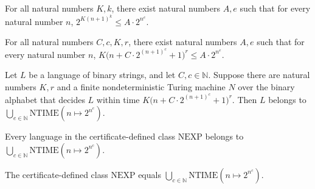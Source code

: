 \begin{lemma}
\label{Complexity.a2_exponent_bound}
\leanok
{}
For all natural numbers $K,k$, there exist natural numbers $A,e$ such that for every
natural number $n$, $2^{K(n+1)^k}\le A\cdot 2^{n^e}$.
\end{lemma}

\begin{lemma}
\label{Complexity.a2_envelope}
\leanok
{}
For all natural numbers $C,c,K,r$, there exist natural numbers $A,e$ such that for every
natural number $n$, $K\bigl(n+C\cdot 2^{(n+1)^c}+1\bigr)^r\le A\cdot 2^{n^e}$.
\end{lemma}

\begin{lemma}
\label{Complexity.a2_normalize}
\leanok
{}
Let $L$ be a language of binary strings, and let $C,c\in\mathbb{N}$. Suppose there are
natural numbers $K,r$ and a finite nondeterministic Turing machine $N$ over the binary
alphabet that decides $L$ within time $K\bigl(n+C\cdot 2^{(n+1)^c}+1\bigr)^r$. Then $L$
belongs to $\bigcup_{e\in\mathbb{N}}\mathrm{NTIME}(n\mapsto 2^{n^e})$.
\end{lemma}

\begin{theorem}
\label{Complexity.NEXP_subset_iUnion_NTIME}
\leanok
{}
Every language in the certificate-defined class $\mathrm{NEXP}$ belongs to
$\bigcup_{c\in\mathbb{N}}\mathrm{NTIME}(n\mapsto 2^{n^c})$.
\end{theorem}

\begin{theorem}
\label{Complexity.NEXP_eq_iUnion_NTIME}
\leanok
{}
The certificate-defined class $\mathrm{NEXP}$ equals
$\bigcup_{c\in\mathbb{N}}\mathrm{NTIME}(n\mapsto 2^{n^c})$.
\end{theorem}

